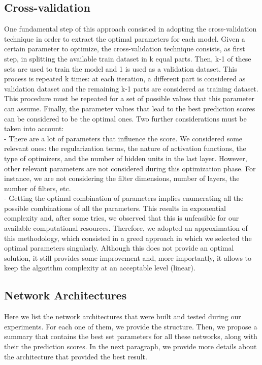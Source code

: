 \documentclass[10pt,conference,compsocconf]{IEEEtran}
\begin{document}
\subsection{Cross-validation}
One fundamental step of this approach consisted in adopting the cross-validation technique in order to extract the optimal parameters for each model. Given a certain parameter to optimize, the cross-validation technique consists, as first step, in splitting the available train dataset in k equal parts. Then, k-1 of these sets are used to train the model and 1 is used as a validation dataset. This process is repeated k times: at each iteration, a different part is considered as validation dataset and the remaining k-1 parts are considered as training dataset. This procedure must be repeated for a set of possible values that this parameter can assume. Finally, the parameter values that lead to the best prediction scores can be considered to be the optimal ones.
Two further considerations must be taken into account:\\
- There are a lot of parameters that influence the score. We considered some relevant ones: the regularization terms, the nature of activation functions, the type of optimizers, and the number of hidden units in the last layer. However, other relevant parameters are not considered during this optimization phase. For instance, we are not considering the filter dimensions, number of layers, the number of filters, etc. \\
- Getting the optimal combination of parameters implies enumerating all the possible combinations of all the parameters. This results in exponential complexity and, after some tries, we observed that this is unfeasible for our available computational resources. Therefore, we adopted an approximation of this methodology, which consisted in a greed approach in which we selected the optimal parameters singularly. Although this does not provide an optimal solution, it still provides some improvement and, more importantly, it allows to keep the algorithm complexity at an acceptable level (linear). \\

\subsection{Network Architectures}
Here we list the network architectures that were built and tested during our experiments. For each one of them, we provide the structure. Then, we propose a summary that contains the best set parameters for all these networks, along with their the prediction scores. In the next paragraph, we provide more details about the architecture that provided the best result. %
\end{document}
